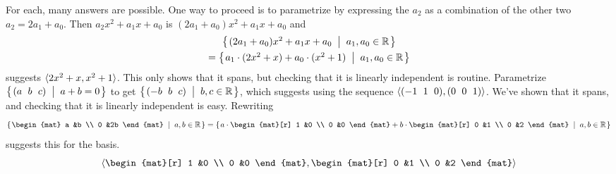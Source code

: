 \begin{Answer}
For each, many answers are possible.
\Question One way to proceed is to parametrize by
            expressing the $a_2$ as a combination of the other two
            $a_2=2a_1+a_0$.
            Then
            $a_2x^2+a_1x+a_0$ is $(2a_1+a_0)x^2+a_1x+a_0$ and
            \begin{multline*} 
              \mbox{$\left\{\hspace{0.1em}(2a_1+a_0)x^2+a_1x+a_0\;\;\middle|\;\; a_1,a_0\in\mathbb{R}\hspace{0.1em}\right\}$}          \\
              =\mbox{$\left\{\hspace{0.1em}a_1\cdot(2x^2+x)+a_0\cdot(x^2+1)\;\;\middle|\;\; a_1,a_0\in\mathbb{R}\hspace{0.1em}\right\}$}
            \end{multline*}
            suggests 
            $\langle2x^2+x,x^2+1\rangle$.
            This only shows that 
            it spans, but checking that it is linearly independent
            is routine.
\Question Parametrize $\set{\rowvec{a  &b  &c}\suchthat a+b=0}$ 
            to get $\set{\rowvec{-b &b &c}\suchthat b,c\in\Re}$, which suggests
            using the sequence $\sequence{\rowvec{-1 &1 &0},\rowvec{0 &0 &1}}$.
            We've shown that it spans, and checking that it is linearly 
            independent is easy.
\Question Rewriting
            \begin{equation*}
              \set{\begin{mat}
                     a  &b  \\
                     0  &2b
                   \end{mat}\suchthat a,b\in\Re}
              =\set{a\cdot\begin{mat}[r]
                     1  &0  \\
                     0  &0 
                   \end{mat}
                  +b\cdot\begin{mat}[r]
                           0  &1  \\
                           0  &2
                          \end{mat} \suchthat a,b\in\Re}
            \end{equation*}
            suggests this for the basis.
            \begin{equation*}
              \sequence{\begin{mat}[r]
                          1  &0  \\
                          0  &0
                        \end{mat},
                        \begin{mat}[r]
                          0  &1  \\
                          0  &2
                        \end{mat}}
            \end{equation*}

\end{Answer}
